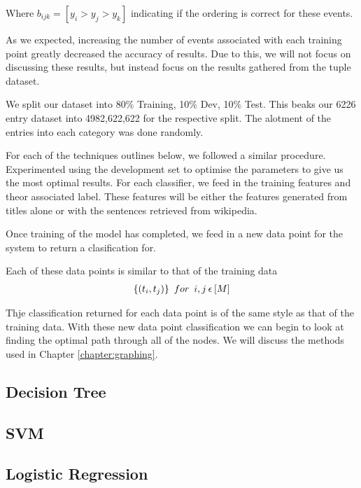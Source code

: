 \documentclass[bsc,frontabs,twoside,singlespacing,parskip,deptreport]{infthesis}     %
\begin{document}
Where $b_{ijk} = [y_i > y_j > y_k]$ indicating if the ordering is correct for these events.


As we expected, increasing the number of events associated with each training point greatly decreased the accuracy of results.
Due to this, we will not focus on discussing these results, but instead focus on the results gathered from the tuple dataset.

We split our dataset into 80\% Training, 10\% Dev, 10\% Test. This beaks our 6226 entry dataset into 4982,622,622 for the respective split.
The alotment of the entries into each category was done randomly.

For each of the techniques outlines below, we followed a similar procedure.
Experimented using the development set to optimise the parameters to give us the most optimal results.
For each classifier, we feed in the training features and theor associated label. These features will
be either the features generated from titles alone or with the sentences retrieved from wikipedia.

Once training of the model has completed, we feed in a new data point for the system to return a clasification for.

Each of these data points is similar to that of the training data
 \begin{eqnarray}
   \{(t_{i},t_{j})\} \hspace{0.5em} for \hspace{0.5em} i,j \hspace{0.2em}\epsilon \hspace{0.2em}[M]\nonumber
 \end{eqnarray}

 Thje classification returned for each data point is of the same style as that of the training data.
 With these new data point classification we can begin to look at finding the optimal path through all of the nodes.
 We will discuss the methods used in Chapter \ref{chapter:graphing}.


 \subsection{Decision Tree}
 \subsection{SVM}
 \subsection{Logistic Regression}
\end{document}
